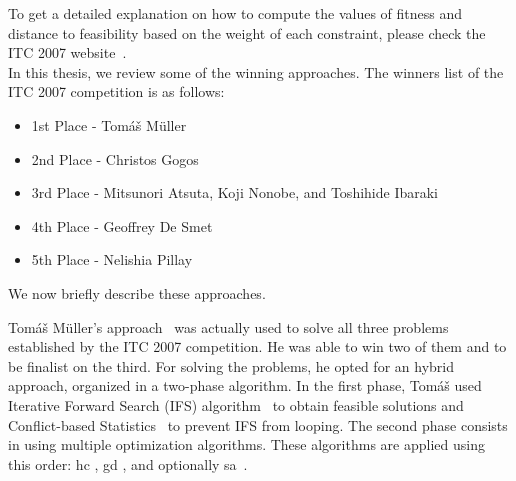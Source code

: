 To get a detailed explanation on how to compute the values of fitness and distance to feasibility based on the weight of each constraint, please check the ITC 2007 website~\cite{McCollum2008}.\\


In this thesis, we review some of the winning approaches. The winners list of the ITC 2007 competition is as follows:
\begin{itemize}
	\item 1st Place - Tom\'{a}\v{s} M\"{u}ller
	\item 2nd Place - Christos Gogos
	\item 3rd Place - Mitsunori Atsuta, Koji Nonobe, and Toshihide Ibaraki
	\item 4th Place - Geoffrey De Smet
	\item 5th Place - Nelishia Pillay
\end{itemize}

We now briefly describe these approaches.

Tom\'{a}\v{s} M\"{u}ller's approach~\cite{Mueller2009} was actually used to solve all three problems established by the ITC 2007 competition. He was able to win two of them and to be finalist on the third. For solving the problems, he opted for an hybrid approach, organized in a two-phase algorithm. In the first phase, Tom\'{a}\v{s} used Iterative Forward Search (IFS) algorithm~\cite{Mueller2005} to obtain feasible solutions and Conflict-based Statistics~\cite{Mueller2004} to prevent IFS from looping. 
The second phase consists in using multiple optimization algorithms. These algorithms are applied using this order: \gls{hc} \cite{Russell2010}, \gls{gd} \cite{Dueck1993}, and optionally \gls{sa}~\cite{Kirkpatrick1983}.\\


